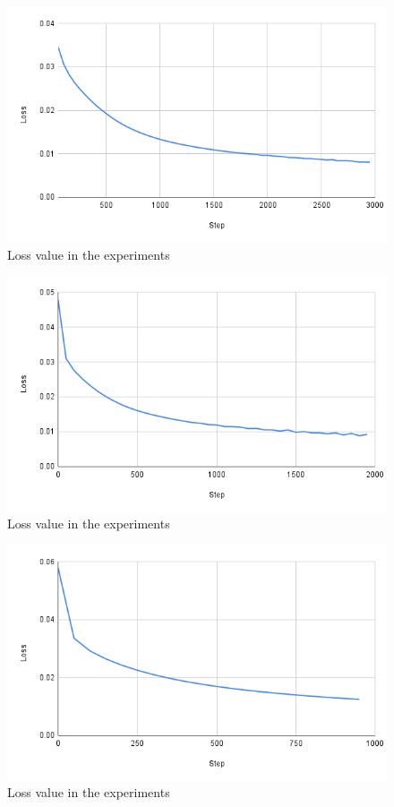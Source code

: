 \begin{figure}[h]
  \centering
  \includegraphics[keepaspectratio, scale=0.5]{images/3000.png}
  \caption{Loss value in the experiments}
  \label{Fig:3000}
  \end{figure}

\begin{figure}[h]
  \centering
  \includegraphics[keepaspectratio, scale=0.5]{images/2000.png}
  \caption{Loss value in the experiments}
  \label{Fig:2000}
  \end{figure}

\begin{figure}[h]
  \centering
  \includegraphics[keepaspectratio, scale=0.5]{images/1000.png}
  \caption{Loss value in the experiments}
  \label{Fig:1000}
  \end{figure}